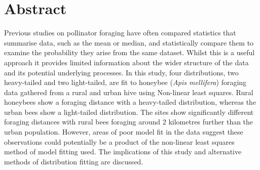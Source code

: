 \documentclass[11pt]{article}
\begin{document}
\section{Abstract}
\begin{center}	
\begin{linenumbers}

Previous studies on pollinator foraging have often compared statistics that summarise data, such as the mean or median, and statistically compare them to examine the probability they arise from the same dataset. Whilst this is a useful approach it provides limited information about the wider structure of the data and its potential underlying processes. In this study, four distributions, two heavy-tailed and two light-tailed, are fit to honeybee (\textit{Apis mellifera}) foraging data gathered from a rural and urban hive using Non-linear least squares. Rural honeybees show a foraging distance with a heavy-tailed distribution, whereas the urban bees show a light-tailed distribution. The sites show significantly different foraging distances with rural bees foraging around 2 kilometres further than the urban population. However, areas of poor model fit in the data suggest these observations could potentially be a product of the non-linear least squares method of model fitting used. The implications of this study and alternative methods of distribution fitting are discussed.

\end{linenumbers}
\end{center}
\end{document}
